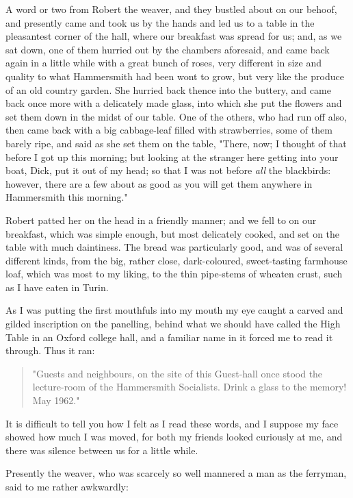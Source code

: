 A word or two from Robert the weaver, and they bustled about on our
behoof, and presently came and took us by the hands and led us to a
table in the pleasantest corner of the hall, where our breakfast was
spread for us; and, as we sat down, one of them hurried out by the
chambers aforesaid, and came back again in a little while with a great
bunch of roses, very different in size and quality to what Hammersmith
had been wont to grow, but very like the produce of an old country
garden. She hurried back thence into the buttery, and came back once
more with a delicately made glass, into which she put the flowers and
set them down in the midst of our table. One of the others, who had run
off also, then came back with a big cabbage-leaf filled with
strawberries, some of them barely ripe, and said as she set them on the
table, "There, now; I thought of that before I got up this morning; but
looking at the stranger here getting into your boat, Dick, put it out of
my head; so that I was not before \emph{all} the blackbirds: however,
there are a few about as good as you will get them anywhere in
Hammersmith this morning."

Robert patted her on the head in a friendly manner; and we fell to on
our breakfast, which was simple enough, but most delicately cooked, and
set on the table with much daintiness. The bread was particularly good,
and was of several different kinds, from the big, rather close,
dark-coloured, sweet-tasting farmhouse loaf, which was most to my
liking, to the thin pipe-stems of wheaten crust, such as I have eaten in
Turin.

As I was putting the first mouthfuls into my mouth my eye caught a
carved and gilded inscription on the panelling, behind what we should
have called the High Table in an Oxford college hall, and a familiar
name in it forced me to read it through. Thus it ran:

\begin{quotation}
  "Guests and neighbours, on the site of this Guest-hall once stood
  the lecture-room of the Hammersmith Socialists.  Drink a glass to
  the memory!  May 1962."
\end{quotation}

It is difficult to tell you how I felt as I read these words, and I
suppose my face showed how much I was moved, for both my friends looked
curiously at me, and there was silence between us for a little while.

Presently the weaver, who was scarcely so well mannered a man as the
ferryman, said to me rather awkwardly:

